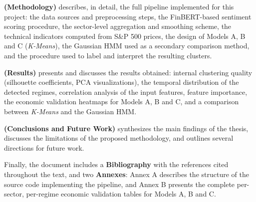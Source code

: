 \textbf{ (Methodology)} describes, in detail, the
full pipeline implemented for this project: the data sources and
preprocessing steps, the FinBERT-based sentiment scoring procedure, the
sector-level aggregation and smoothing scheme, the technical indicators
computed from S\&P 500 prices, the design of Models A, B and C
(\textit{K-Means}), the Gaussian HMM used as a secondary comparison
method, and the procedure used to label and interpret the resulting
clusters.

\textbf{ (Results)} presents and discusses the results
obtained: internal clustering quality (silhouette coefficients, PCA
visualizations), the temporal distribution of the detected regimes,
correlation analysis of the input features, feature importance, the
economic validation heatmaps for Models A, B and C, and a comparison
between \textit{K-Means} and the Gaussian HMM.

\textbf{ (Conclusions and Future Work)} synthesizes
the main findings of the thesis, discusses the limitations of the proposed
methodology, and outlines several directions for future work.

Finally, the document includes a \textbf{Bibliography} with the
references cited throughout the text, and two \textbf{Annexes}: Annex A
describes the structure of the source code implementing the pipeline, and
Annex B presents the complete per-sector, per-regime economic validation
tables for Models A, B and C.
